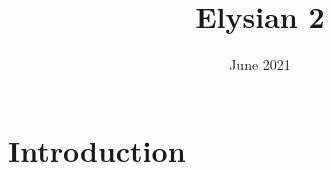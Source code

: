 \documentclass{article}
\title{Elysian 2}
\author{ }
\date{June 2021}
\begin{document}
\maketitle

\section{Introduction}
\end{document}
